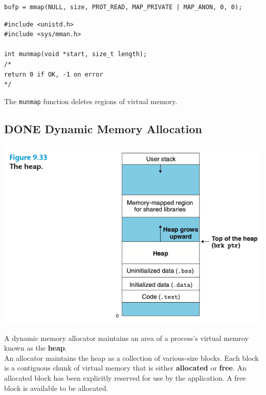 \documentclass[11pt]{article}
\begin{document}
\begin{verbatim}
bufp = mmap(NULL, size, PROT_READ, MAP_PRIVATE | MAP_ANON, 0, 0);
\end{verbatim}


\begin{verbatim}
#include <unistd.h>
#include <sys/mman.h>

int munmap(void *start, size_t length);
/*
return 0 if OK, -1 on error
*/
\end{verbatim}
The \texttt{munmap} function deletes regions of virtual memory.\\


\subsection{{\bfseries\sffamily DONE} Dynamic Memory Allocation}
\label{sec:org182fbd0}

\begin{center}
\includegraphics[width=.9\linewidth]{pics/figure9.33-the-heap.png}
\end{center}

A dynamic memory allocator maintains an area of a process's virtual memroy known as the \textbf{heap}.\\

An allocator maintains the heap as a collection of various-size blocks. Each block is a contiguous chunk of virtual memory that is either \textbf{allocated} or \textbf{free}. An allocated block has been explicitly reserved for use by the application. A free block is available to be allocated.\\
\end{document}
